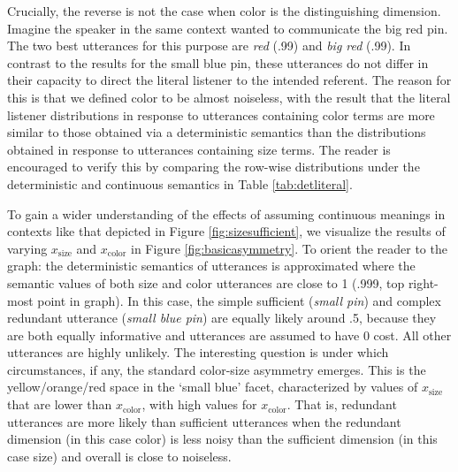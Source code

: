 \documentclass[11pt]{article}
\newcommand{\tableref}[1]{Table \ref{#1}}
\newcommand{\figref}[1]{Figure \ref{#1}}
\begin{document}
Crucially, the reverse is not the case when color is the distinguishing dimension. Imagine the speaker in the same context wanted to communicate the big red pin. The two best utterances for this purpose are \emph{red} (.99) and \emph{big red} (.99). In contrast to the results for the small blue pin, these utterances do not differ in their capacity to direct the literal listener to the intended referent. The reason for this is that we defined color to be almost noiseless, with the result that the literal listener distributions in response to utterances containing color terms are more similar to those obtained via a deterministic semantics than the distributions obtained in response to utterances containing size terms. The reader is encouraged to verify this by comparing the row-wise distributions under the  deterministic and continuous semantics in \tableref{tab:detliteral}.


To gain a wider understanding of the effects of assuming continuous meanings in contexts like that depicted in \figref{fig:sizesufficient}, we visualize the results of varying  $x_{\text{size}}$ and $x_{\text{color}}$ in \figref{fig:basicasymmetry}. To orient the reader to the graph: the deterministic semantics of utterances is approximated where the  semantic values of both size and color utterances are close to 1 (.999, top right-most point in graph).  In this case, the simple sufficient (\emph{small pin}) and complex redundant utterance (\emph{small blue pin}) are equally likely around .5, because they are both equally informative and utterances are assumed to have 0 cost. All other utterances are highly unlikely. The interesting question is under which circumstances, if any,  the standard color-size asymmetry emerges. This is the yellow/orange/red space in the `small blue' facet, characterized by values of $x_{\text{size}}$ that are lower than $x_{\text{color}}$, with high values for $x_{\text{color}}$. That is, redundant utterances are more likely than sufficient utterances when the redundant dimension (in this case color) is less noisy than the sufficient dimension (in this case size) and overall is close to noiseless. 
\end{document}
